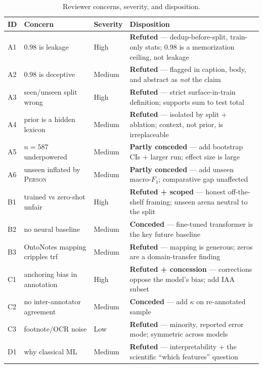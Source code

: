 \documentclass[11pt]{article}
\begin{document}
\begin{table}[!htbp]
\centering
\small
\renewcommand{\arraystretch}{1.25}
\caption{Reviewer concerns, severity, and disposition.}
\label{tab:scorecard}
\begin{tabularx}{\textwidth}{@{}l l l X@{}}
\toprule
\textbf{ID} & \textbf{Concern} & \textbf{Severity} & \textbf{Disposition} \\
\midrule
A1 & $0.98$ is leakage                 & High   & \textbf{Refuted} --- dedup-before-split, train-only stats; $0.98$ is a memorization ceiling, not leakage \\
A2 & $0.98$ is deceptive               & Medium & \textbf{Refuted} --- flagged in caption, body, and abstract as \emph{not} the claim \\
A3 & seen/unseen split wrong           & High   & \textbf{Refuted} --- strict surface-in-train definition; supports sum to test total \\
A4 & prior is a hidden lexicon         & Medium & \textbf{Refuted} --- isolated by split + ablation; context, not prior, is irreplaceable \\
A5 & $n{=}587$ underpowered            & Medium & \textbf{Partly conceded} --- add bootstrap CIs + larger run; effect size is large \\
A6 & unseen inflated by \textsc{Person}& Medium & \textbf{Partly conceded} --- add unseen macro-$F_1$; comparative gap unaffected \\
B1 & trained vs zero-shot unfair       & High   & \textbf{Refuted + scoped} --- honest off-the-shelf framing; unseen arena neutral to the split \\
B2 & no neural baseline                & Medium & \textbf{Conceded} --- fine-tuned transformer is the key future baseline \\
B3 & OntoNotes mapping cripples trf    & Medium & \textbf{Refuted} --- mapping is generous; zeros are a domain-transfer finding \\
C1 & anchoring bias in annotation      & High   & \textbf{Refuted + concession} --- corrections oppose the model's bias; add IAA subset \\
C2 & no inter-annotator agreement      & Medium & \textbf{Conceded} --- add $\kappa$ on re-annotated sample \\
C3 & footnote/OCR noise                & Low    & \textbf{Refuted} --- minority, reported error mode; symmetric across models \\
D1 & why classical ML                  & Medium & \textbf{Refuted} --- interpretability + the scientific ``which features'' question \\

\end{tabularx}
\end{table}
\end{document}
